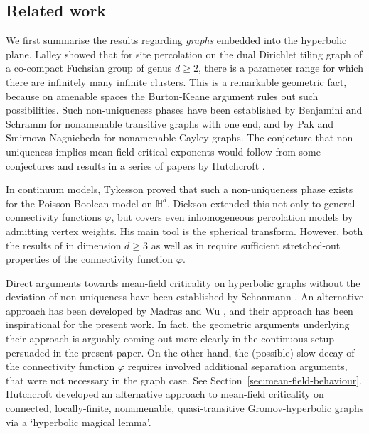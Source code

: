 \documentclass[10pt,a4paper,dvipsnames]{article}
\theoremstyle{definition}
\theoremstyle{remark}
\newcommand{\HypDim}{{\mathbb{H}^d}}
\newcommand{\connf}{\varphi}
\numberwithin{equation}{section}
\begin{document}
\subsection{Related work}
We first summarise the results regarding \emph{graphs} embedded into the hyperbolic plane. Lalley \cite{Lalle98} showed that for site percolation on the dual Dirichlet tiling graph of a co-compact Fuchsian group of genus $d\ge2$, there is a parameter range for which there are infinitely many infinite clusters. This is a remarkable geometric fact, because on amenable spaces the Burton-Keane argument rules out such possibilities. 
Such non-uniqueness phases have been established by Benjamini and Schramm \cite{BenjaSchra96} for nonamenable transitive graphs with one end, and by Pak and Smirnova-Nagniebeda \cite{PakSmirn00} for nonamenable Cayley-graphs. The conjecture that non-uniqueness implies mean-field critical exponents would follow from some conjectures and results in a series of papers by Hutchcroft \cite{Hutch20,Hutch20b,hutchcroft2022derivation}.

In continuum models, Tykesson \cite{Tykes07} proved that such a non-uniqueness phase exists for the Poisson Boolean model on $\HypDim$. Dickson \cite{dickson2024NonUniqueness} extended this not only to general connectivity functions $\varphi$, but covers even inhomogeneous percolation models by admitting vertex weights. His main tool is the spherical transform.
However, both the results of \cite{Tykes07} in dimension $d\ge3$ as well as in \cite{dickson2024NonUniqueness} require sufficient stretched-out properties of the connectivity function $\connf$. 

Direct arguments towards mean-field criticality on hyperbolic graphs without the deviation of non-uniqueness have been established by Schonmann \cite{Schon01,Schon02}. 
An alternative approach has been developed by Madras and Wu \cite{madras2010trees}, and their approach has been inspirational for the present work. In fact, the geometric arguments underlying their approach is arguably coming out more clearly in the continuous setup persuaded in the present paper. On the other hand, the (possible) slow decay of the connectivity function $\connf$ requires involved additional separation arguments, that were not necessary in the graph case. See Section~\ref{sec:mean-field-behaviour}. 
Hutchcroft \cite{Hutch19} developed an alternative approach to mean-field criticality on connected, locally-finite, nonamenable, quasi-transitive Gromov-hyperbolic graphs via a `hyperbolic magical lemma'.
\end{document}
